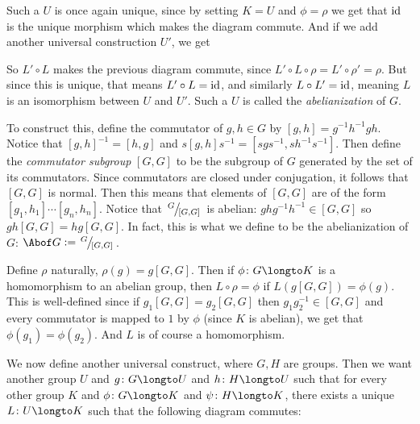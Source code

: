\centerline{\def\diagcolwidth{1cm}\def\diagrowheight{.75cm}}

Such a $U$ is once again unique, since by setting $K=U$ and $\phi=\rho$ we get that ${\rm id}$ is the unique morphism which makes the diagram commute.
And if we add another universal construction $U'$, we get

\medskip
\centerline{\def\diagcolwidth{1cm}\def\diagrowheight{.75cm}}

So $L'\circ L$ makes the previous diagram commute, since $L'\circ L\circ \rho=L'\circ \rho'=\rho$.
But since this is unique, that means $L'\circ L={\rm id}$, and similarly $L\circ L'={\rm id}$, meaning $L$ is an isomorphism between $U$ and $U'$.
Such a $U$ is called the {\it abelianization} of $G$.

To construct this, define the commutator of $g,h\in G$ by $[g,h]=g^{-1}h^{-1}gh$.
Notice that $[g,h]^{-1}=[h,g]$ and $s[g,h]s^{-1}=[sgs^{-1},sh^{-1}s^{-1}]$.
Then define the {\it commutator subgroup} $[G,G]$ to be the subgroup of $G$ generated by the set of its commutators.
Since commutators are closed under conjugation, it follows that $[G,G]$ is normal.
Then this means that elements of $[G,G]$ are of the form $[g_1,h_1]\cdots[g_n,h_n]$.
Notice that $\slfrac G{[G,G]}$ is abelian: $ghg^{-1}h^{-1}\in[G,G]$ so $gh[G,G]=hg[G,G]$.
In fact, this is what we define to be the abelianization of $G$: $\Abof G\coloneqq\slfrac G{[G,G]}$.

Define $\rho$ naturally, $\rho(g)=g[G,G]$.
Then if $\phi\colon G\longto K$ is a homomorphism to an abelian group, then $L\circ\rho=\phi$ if $L(g[G,G])=\phi(g)$.
This is well-defined since if $g_1[G,G]=g_2[G,G]$ then $g_1g_2^{-1}\in[G,G]$ and every commutator is mapped to $1$ by $\phi$ (since $K$ is abelian), we get that $\phi(g_1)=\phi(g_2)$.
And $L$ is of course a homomorphism.

\medskip
We now define another universal construct, where $G,H$ are groups.
Then we want another group $U$ and $g\colon G\longto U$ and $h\colon H\longto U$ such that for every other group $K$ and $\phi\colon G\longto K$ and $\psi\colon H\longto K$, there exists a unique
$L\colon U\longto K$ such that the following diagram commutes:

